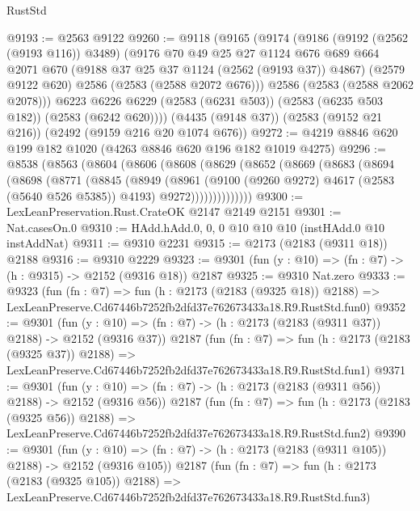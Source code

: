 \begin{lexlean}{RustStd}
\begin{coremodule}
@9193 := @2563 @9122
@9260 := @9118
    (@9165
      (@9174
        (@9186
          (@9192 (@2562 (@9193 @116)) @3489)
          (@9176
            @70
            @49
            @25
            @27
            @1124
            @676
            @689
            @664
            @2071
            @670
            (@9188 @37 @25 @37 @1124 (@2562 (@9193 @37)) @4867)
            (@2579 @9122 @620)
            @2586
            (@2583 (@2588 @2072 @676)))
          @2586
          (@2583 (@2588 @2062 @2078)))
        @6223
        @6226
        @6229
        (@2583 (@6231 @503))
        (@2583 (@6235 @503 @182))
        (@2583 (@6242 @620))))
    (@4435 (@9148 @37))
    (@2583 (@9152 @21 @216))
    (@2492 (@9159 @216 @20 @1074 @676))
@9272 := @4219 @8846 @620 @199 @182 @1020 (@4263 @8846 @620 @196 @182 @1019 @4275)
@9296 := @8538
    (@8563
      (@8604
        (@8606
          (@8608
            (@8629
              (@8652
                (@8669
                  (@8683
                    (@8694
                      (@8698
                        (@8771
                          (@8845
                            (@8949
                              (@8961
                                (@9100 (@9260 @9272) @4617 (@2583 (@5640 @526 @5385)) @4193)
                                @9272))))))))))))))
@9300 := LexLeanPreservation.Rust.CrateOK @2147 @2149 @2151
@9301 := Nat.casesOn.{0}
@9310 := HAdd.hAdd.{0, 0, 0} @10 @10 @10 (instHAdd.{0} @10 instAddNat)
@9311 := @9310 @2231
@9315 := @2173 (@2183 (@9311 @18)) @2188
@9316 := @9310 @2229
@9323 := @9301 (fun (y : @10) => (fn : @7) -> (h : @9315) -> @2152 (@9316 @18)) @2187
@9325 := @9310 Nat.zero
@9333 := @9323
    (fun (fn : @7) =>
    fun (h : @2173 (@2183 (@9325 @18)) @2188) =>
    LexLeanPreserve.Cd67446b7252fb2dfd37e762673433a18.R9.RustStd.fun0)
@9352 := @9301
    (fun (y : @10) => (fn : @7) -> (h : @2173 (@2183 (@9311 @37)) @2188) -> @2152 (@9316 @37))
    @2187
    (fun (fn : @7) =>
    fun (h : @2173 (@2183 (@9325 @37)) @2188) =>
    LexLeanPreserve.Cd67446b7252fb2dfd37e762673433a18.R9.RustStd.fun1)
@9371 := @9301
    (fun (y : @10) => (fn : @7) -> (h : @2173 (@2183 (@9311 @56)) @2188) -> @2152 (@9316 @56))
    @2187
    (fun (fn : @7) =>
    fun (h : @2173 (@2183 (@9325 @56)) @2188) =>
    LexLeanPreserve.Cd67446b7252fb2dfd37e762673433a18.R9.RustStd.fun2)
@9390 := @9301
    (fun (y : @10) => (fn : @7) -> (h : @2173 (@2183 (@9311 @105)) @2188) -> @2152 (@9316 @105))
    @2187
    (fun (fn : @7) =>
    fun (h : @2173 (@2183 (@9325 @105)) @2188) =>
    LexLeanPreserve.Cd67446b7252fb2dfd37e762673433a18.R9.RustStd.fun3)

\end{coremodule}
\end{lexlean}
